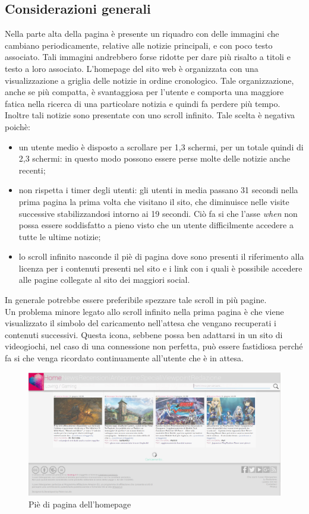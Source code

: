 \documentclass[../ProgettoTecWeb2.tex]{subfiles}
\begin{document}
	\subsection{Considerazioni generali}
		Nella parte alta della pagina è presente un riquadro con delle immagini che cambiano periodicamente, relative alle notizie principali, e con poco testo associato. Tali immagini andrebbero forse ridotte per dare più risalto a titoli e testo a loro associato.
		L'homepage del sito web è organizzata con una visualizzazione a griglia delle notizie in ordine cronologico. Tale organizzazione, anche se più compatta, è svantaggiosa per l'utente e comporta una maggiore fatica nella ricerca di una particolare notizia e quindi fa perdere più tempo.
		Inoltre tali notizie sono presentate con uno scroll infinito. Tale scelta è negativa poichè:
		\begin{itemize}
			\item un utente medio è disposto a scrollare per 1,3 schermi, per un totale quindi di 2,3 schermi: in questo modo possono essere perse molte delle notizie anche recenti;
			\item non rispetta i timer degli utenti: gli utenti in media passano 31 secondi nella prima pagina la prima volta che visitano il sito, che diminuisce nelle visite successive stabilizzandosi intorno ai 19 secondi. Ciò fa si che l'asse \textit{when} non possa essere soddisfatto a pieno visto che un utente difficilmente accedere a tutte le ultime notizie;
			\item lo scroll infinito nasconde il piè di pagina dove sono presenti il riferimento alla licenza per i contenuti presenti nel sito e i link con i quali è possibile accedere alle pagine collegate al sito dei maggiori social. 
		\end{itemize}
		In generale potrebbe essere preferibile spezzare tale scroll in più pagine. \\
		Un problema minore legato allo scroll infinito nella prima pagina è che viene visualizzato il simbolo del caricamento nell'attesa che vengano recuperati i contenuti successivi. Questa icona, sebbene possa ben adattarsi in un sito di videogiochi, nel caso di una connessione non perfetta, può essere fastidiosa perché fa si che venga ricordato continuamente all'utente che è in attesa.
		\begin{figure} [H]
			\centering
			\includegraphics[scale=0.3]{img/PieDiPaginaHomepage}
			\caption{Piè di pagina dell'homepage}
		\end{figure}
\end{document}

